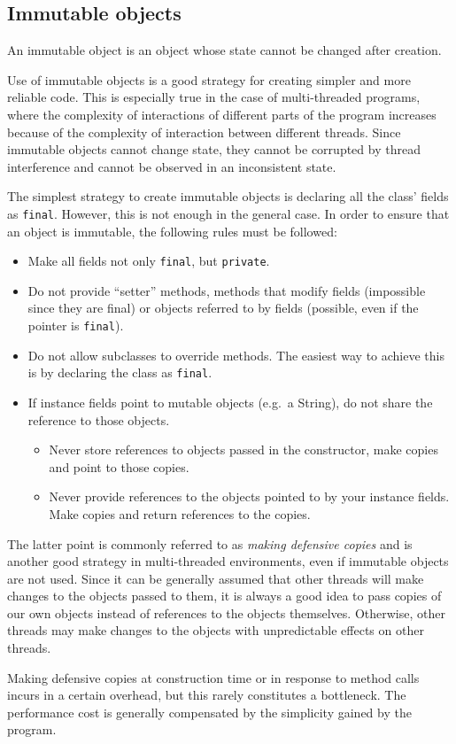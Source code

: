 \subsection{Immutable objects}
\label{sec:immutable-objects}

An immutable object is an object whose state cannot be changed after
creation. 

Use of immutable objects is a good strategy for creating simpler and
more reliable code. This is especially true in the case of
multi-threaded programs, where the complexity of interactions of
different parts of the program increases because of the complexity of
interaction between different threads. Since immutable objects cannot
change state, they cannot be corrupted by thread interference and
cannot be observed in an inconsistent state.

The simplest strategy to create immutable objects is declaring all the
class' fields as \verb+final+. However, this is not enough in the general
case. In order to ensure that an object is immutable, the following
rules must be followed: 

\begin{itemize}
\item Make all fields not only \verb+final+, but \verb+private+.
\item Do not provide ``setter'' methods, methods that modify fields
  (impossible since they are final) or objects referred to by fields
  (possible, even if the pointer is \verb+final+).
\item Do not allow subclasses to override methods. The easiest way to
  achieve this is by declaring the class as \verb+final+.
\item If instance fields point to mutable objects (e.g.~a String),
  do not share the reference to those objects. 
  \begin{itemize}
  \item Never store references to objects passed in the constructor,
    make copies and point to those copies.
  \item Never provide references to the objects pointed to by your
    instance fields. Make copies and return references to the copies. 
  \end{itemize}
\end{itemize}

The latter point is commonly referred to as \emph{making defensive
  copies} and is another good strategy in multi-threaded environments,
even if immutable objects are not used. 
%
Since it can be generally assumed that other threads will make
changes to the objects passed to them, it is always a good idea to
pass copies of our own objects instead of references to the objects
themselves. Otherwise, other threads may make changes to the objects
with unpredictable effects on other threads. 

Making defensive copies at construction time or in response to method
calls incurs in a certain overhead, but this rarely constitutes a
bottleneck. The performance cost is generally compensated by the
simplicity gained by the program. 

